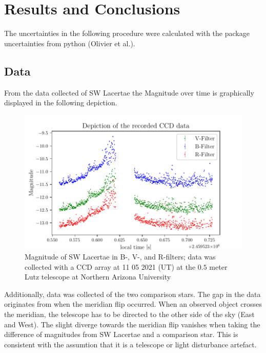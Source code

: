 \section{Results and Conclusions}
\label{sec:make}

\noindent The uncertainties in the following procedure were calculated with the package 
  uncertainties from python (Olivier et al.).

\subsection{Data}
  \label{sec:America}
  From the data collected of SW Lacertae the Magnitude over time is graphically displayed in the following depiction.
  \begin{figure}[H]
    \centering
    \includegraphics{Magnitude.pdf}
    \caption{Magnitude of SW Lacertae in B-, V-, and R-filters; 
    data was collected with a CCD array at 11 05 2021 (UT) at the $0.5$ meter Lutz telescope
    at Northern Arizona University}
  \end{figure}
  \noindent Additionally, data was collected of the two comparison stars. The gap in the data originates from when
  the meridian flip occurred. When an observed object crosses the meridian, the telescope has to be directed 
  to the other side of the sky (East and West). The slight diverge towards the meridian flip vanishes when taking the 
  difference of magnitudes from SW Lacertae and a comparison star. This is consistent with the 
  assumtion that it is a telescope or light disturbance artefact.\\
  
